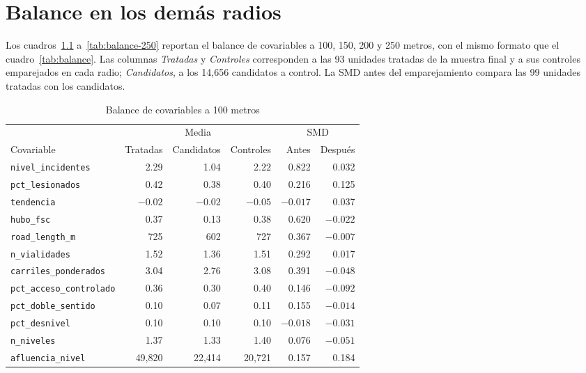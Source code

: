 \chapter{Balance en los demás radios}
\label{apendice:balance}

\noindent Los cuadros~\ref{tab:balance-100} a~\ref{tab:balance-250} reportan el balance de covariables a 100, 150, 200 y 250 metros, con el mismo formato que el cuadro~\ref{tab:balance}. Las columnas \emph{Tratadas} y \emph{Controles} corresponden a las 93 unidades tratadas de la muestra final y a sus controles emparejados en cada radio; \emph{Candidatos}, a los 14,656 candidatos a control. La SMD antes del emparejamiento compara las 99 unidades tratadas con los candidatos.

\begin{table}[htbp]
    \centering
    \caption{Balance de covariables a 100 metros}
    \label{tab:balance-100}
    \footnotesize
    \setlength{\tabcolsep}{4pt}
    \begin{tabular}{l r r r r r}
        \toprule
        & \multicolumn{3}{c}{Media} & \multicolumn{2}{c}{SMD} \\
        \cmidrule(lr){2-4} \cmidrule(lr){5-6}
        Covariable & Tratadas & Candidatos & Controles & Antes & Después \\
        \midrule
        \texttt{nivel\_incidentes} & 2.29 & 1.04 & 2.22 & 0.822 & 0.032 \\
        \texttt{pct\_lesionados} & 0.42 & 0.38 & 0.40 & 0.216 & 0.125 \\
        \texttt{tendencia} & $-0.02$ & $-0.02$ & $-0.05$ & $-0.017$ & 0.037 \\
        \texttt{hubo\_fsc} & 0.37 & 0.13 & 0.38 & 0.620 & $-0.022$ \\
        \texttt{road\_length\_m} & 725 & 602 & 727 & 0.367 & $-0.007$ \\
        \texttt{n\_vialidades} & 1.52 & 1.36 & 1.51 & 0.292 & 0.017 \\
        \texttt{carriles\_ponderados} & 3.04 & 2.76 & 3.08 & 0.391 & $-0.048$ \\
        \texttt{pct\_acceso\_controlado} & 0.36 & 0.30 & 0.40 & 0.146 & $-0.092$ \\
        \texttt{pct\_doble\_sentido} & 0.10 & 0.07 & 0.11 & 0.155 & $-0.014$ \\
        \texttt{pct\_desnivel} & 0.10 & 0.10 & 0.10 & $-0.018$ & $-0.031$ \\
        \texttt{n\_niveles} & 1.37 & 1.33 & 1.40 & 0.076 & $-0.051$ \\
        \texttt{afluencia\_nivel} & 49,820 & 22,414 & 20,721 & 0.157 & 0.184 \\
        \bottomrule
    \end{tabular}
\end{table}

